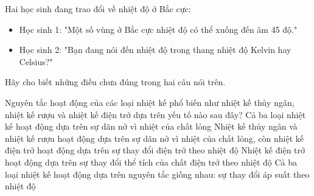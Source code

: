 \begin{ex} 
	Hai học sinh đang trao đổi về nhiệt độ ở Bắc cực:
	\begin{itemize}
		\item Học sinh 1: "Một số vùng ở Bắc cực nhiệt độ có thể xuống đến âm 45 độ."
		\item Học sinh 2: "Bạn đang nói đến nhiệt độ trong thang nhiệt độ Kelvin hay Celsius?" 
	\end{itemize}
	Hãy cho biết những điều chưa đúng trong hai câu nói trên.
\end{ex}








\begin{ex} 
	Nguyên tắc hoạt động của các loại nhiệt kế phổ biến như nhiệt kế thủy ngân, nhiệt kế rượu và nhiệt kế điện trở dựa trên yếu tố nào sau đây?
	\choice
	{Cả ba loại nhiệt kế hoạt động dựa trên sự dãn nở vì nhiệt của chất lỏng}
	{\True Nhiệt kế thủy ngân và nhiệt kế rượu hoạt động dựa trên sự dãn nở vì nhiệt của chất lỏng, còn nhiệt kế điện trở hoạt động dựa trên sự thay đổi điện trở theo nhiệt độ}
	{Nhiệt kế điện trở hoạt động dựa trên sự thay đổi thể tích của chất điện trở theo nhiệt độ}
	{Cả ba loại nhiệt kế hoạt động dựa trên nguyên tắc giống nhau: sự thay đổi áp suất theo nhiệt độ}
\end{ex}


